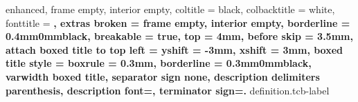 {
    enhanced,
    frame empty,
    interior empty,
    coltitle = black,
    colbacktitle = white,
    fonttitle = \bfseries,
    extras broken = {frame empty, interior empty},
    borderline = {0.4mm}{0mm}{black},
    breakable = true,
    top = 4mm,
    before skip = 3.5mm,
    attach boxed title to top left = {yshift = -3mm, xshift = 3mm},
    boxed title style = {boxrule = 0.3mm, borderline = {0.3mm}{0mm}{black}},
    varwidth boxed title,
    separator sign none, description delimiters parenthesis,
    description font=\bfseries,
    terminator sign={.\hspace{1mm}}
}
{definition.tcb-label}

\newenvironment{section-theorem.tcb}[1][]
{
    \ifstrempty{#1}
    {
        \begin{tcb-theorem-style}{}{}
    }
    {
        \begin{tcb-theorem-style}{#1}{}
    }
    }{
    \end{tcb-theorem-style}
}

\newenvironment{section-problem.tcb}
{
    \begin{tcb-problem-style}{}{}
    }{
    \end{tcb-problem-style}
}

\newenvironment{section-exercise.tcb}
{
    \begin{tcb-exercise-style}{}{}
    }{
    \end{tcb-exercise-style}
}

\newenvironment{section-definition.tcb}[1][]
{
    \ifstrempty{#1}
    {
        \begin{tcb-definition-style}{}{}
    }
    {
        \begin{tcb-definition-style}{#1}{}
    }
    }{
    \end{tcb-definition-style}
}